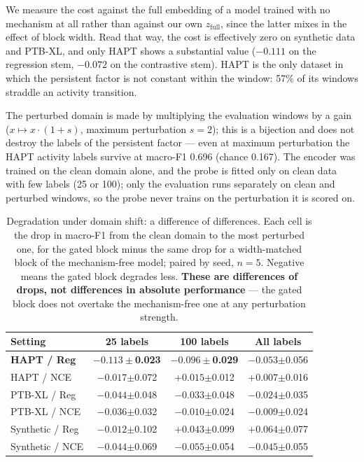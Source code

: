 We measure the cost against the full embedding of a model trained with no mechanism at all rather than against our own $z_{\mathrm{full}}$, since the latter mixes in the effect of block width. Read that way, the cost is effectively zero on synthetic data and PTB-XL, and only HAPT shows a substantial value ($-0.111$ on the regression stem, $-0.072$ on the contrastive stem). HAPT is the only dataset in which the persistent factor is not constant within the window: 57\% of its windows straddle an activity transition.

The perturbed domain is made by multiplying the evaluation windows by a gain ($x \mapsto x\cdot(1+s)$, maximum perturbation $s=2$); this is a bijection and does not destroy the labels of the persistent factor --- even at maximum perturbation the HAPT activity labels survive at macro-F1 0.696 (chance 0.167). The encoder was trained on the clean domain alone, and the probe is fitted only on clean data with few labels (25 or 100); only the evaluation runs separately on clean and perturbed windows, so the probe never trains on the perturbation it is scored on.

\begin{table}[!tbp]
\caption{Degradation under domain shift: a difference of differences. Each cell is the drop in macro-F1 from the clean domain to the most perturbed one, for the gated block minus the same drop for a width-matched block of the mechanism-free model; paired by seed, $n=5$. Negative means the gated block degrades less. \textbf{These are differences of drops, not differences in absolute performance} --- the gated block does not overtake the mechanism-free one at any perturbation strength.}
\label{tab:shift}
\centering
\footnotesize
\begin{tabular}{lccc}
\hline
Setting & 25 labels & 100 labels & All labels \\
\hline
\textbf{HAPT / Reg} & $\mathbf{-0.113}\pm$\textbf{0.023} & $\mathbf{-0.096}\pm$\textbf{0.029} & $-0.053$$\pm$0.056 \\
HAPT / NCE & $-0.017$$\pm$0.072 & $+0.015$$\pm$0.012 & $+0.007$$\pm$0.016 \\
PTB-XL / Reg & $-0.044$$\pm$0.048 & $-0.033$$\pm$0.048 & $-0.024$$\pm$0.035 \\
PTB-XL / NCE & $-0.036$$\pm$0.032 & $-0.010$$\pm$0.024 & $-0.009$$\pm$0.024 \\
Synthetic / Reg & $-0.012$$\pm$0.102 & $+0.043$$\pm$0.099 & $+0.064$$\pm$0.077 \\
Synthetic / NCE & $-0.044$$\pm$0.069 & $-0.055$$\pm$0.054 & $-0.045$$\pm$0.055 \\
\hline
\end{tabular}
\end{table}

